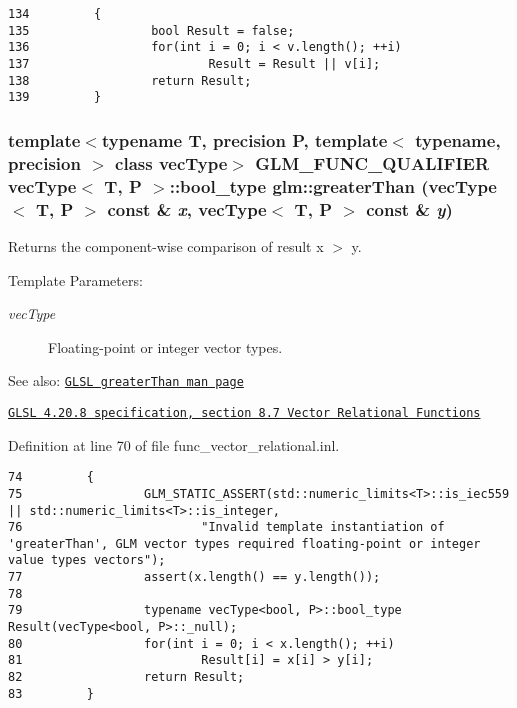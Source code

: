 \begin{Code}\begin{verbatim}134         {
135                 bool Result = false;
136                 for(int i = 0; i < v.length(); ++i)
137                         Result = Result || v[i];
138                 return Result;
139         }
\end{verbatim}
\end{Code}


\hypertarget{group__core__func__vector__relational_g752f4c03f55a280172de9ceff7a02b51}{
\subsubsection[greaterThan]{\setlength{\rightskip}{0pt plus 5cm}template$<$typename T, precision P, template$<$ typename, precision $>$ class vecType$>$ GLM\_\-FUNC\_\-QUALIFIER vecType$<$ T, P $>$::bool\_\-type glm::greaterThan (vecType$<$ T, P $>$ const \& {\em x}, \/  vecType$<$ T, P $>$ const \& {\em y})}}
\label{group__core__func__vector__relational_g752f4c03f55a280172de9ceff7a02b51}


Returns the component-wise comparison of result x $>$ y.

\begin{Desc}
\item[Template Parameters:]
\begin{description}
\item[{\em vecType}]Floating-point or integer vector types.\end{description}
\end{Desc}
\begin{Desc}
\item[See also:]\href{http://www.opengl.org/sdk/docs/manglsl/xhtml/greaterThan.xml}{\tt GLSL greaterThan man page} 

\href{http://www.opengl.org/registry/doc/GLSLangSpec.4.20.8.pdf}{\tt GLSL 4.20.8 specification, section 8.7 Vector Relational Functions} \end{Desc}


Definition at line 70 of file func\_\-vector\_\-relational.inl.

\begin{Code}\begin{verbatim}74         {
75                 GLM_STATIC_ASSERT(std::numeric_limits<T>::is_iec559 || std::numeric_limits<T>::is_integer,
76                         "Invalid template instantiation of 'greaterThan', GLM vector types required floating-point or integer value types vectors");
77                 assert(x.length() == y.length());
78 
79                 typename vecType<bool, P>::bool_type Result(vecType<bool, P>::_null);
80                 for(int i = 0; i < x.length(); ++i)
81                         Result[i] = x[i] > y[i];
82                 return Result;
83         }
\end{verbatim}
\end{Code}



